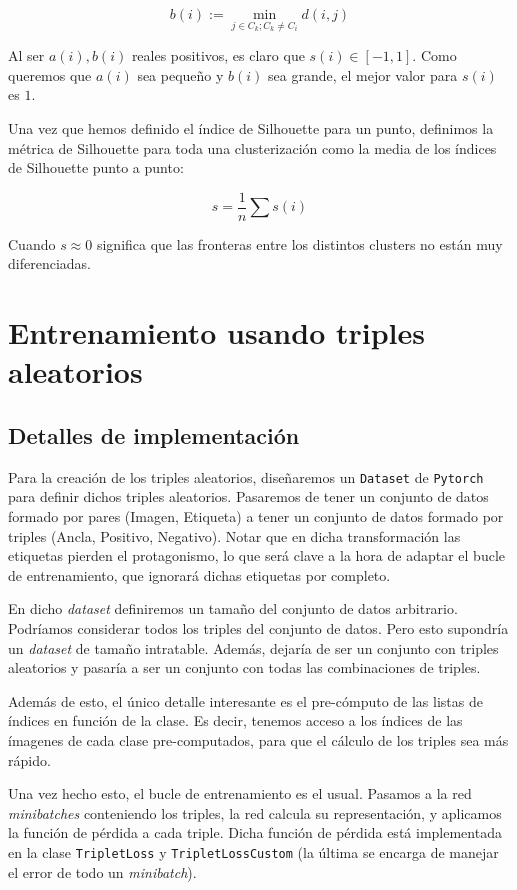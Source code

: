 \documentclass[11pt]{article}
\begin{document}
$$b(i) := \min_{j \in C_k ; C_k \neq C_i} d(i, j)$$

Al ser $a(i), b(i)$ reales positivos, es claro que $s(i) \in [-1, 1]$. Como queremos que $a(i)$ sea pequeño y $b(i)$ sea grande, el mejor valor para $s(i)$ es $1$.

Una vez que hemos definido el índice de Silhouette para un punto, definimos la métrica de Silhouette para toda una clusterización como la media de los índices de Silhouette punto a punto:

$$s = \frac{1}{n} \sum s(i)$$

Cuando $s \approx 0$ significa que las fronteras entre los distintos clusters no están muy diferenciadas.


\pagebreak

\section{Entrenamiento usando triples aleatorios}

\subsection{Detalles de implementación}

Para la creación de los triples aleatorios, diseñaremos un \lstinline{Dataset} de \lstinline{Pytorch} para definir dichos triples aleatorios. Pasaremos de tener un conjunto de datos formado por pares (Imagen, Etiqueta) a tener un conjunto de datos formado por triples (Ancla, Positivo, Negativo). Notar que en dicha transformación las etiquetas pierden el protagonismo, lo que será clave a la hora de adaptar el bucle de entrenamiento, que ignorará dichas etiquetas por completo.

En dicho \emph{dataset} definiremos un tamaño del conjunto de datos arbitrario. Podríamos considerar todos los triples del conjunto de datos. Pero esto supondría un \emph{dataset} de tamaño intratable. Además, dejaría de ser un conjunto con triples aleatorios y pasaría a ser un conjunto con todas las combinaciones de triples.

Además de esto, el único detalle interesante es el pre-cómputo de las listas de índices en función de la clase. Es decir, tenemos acceso a los índices de las ímagenes de cada clase pre-computados, para que el cálculo de los triples sea más rápido.

Una vez hecho esto, el bucle de entrenamiento es el usual. Pasamos a la red \emph{minibatches} conteniendo los triples, la red calcula su representación, y aplicamos la función de pérdida a cada triple. Dicha función de pérdida está implementada en la clase \lstinline{TripletLoss} y \lstinline{TripletLossCustom} (la última se encarga de manejar el error de todo un \emph{minibatch}).
\end{document}
